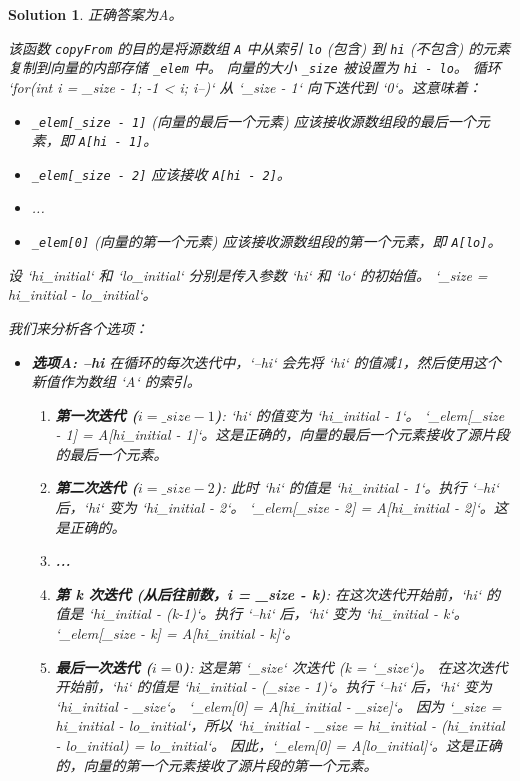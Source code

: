 \documentclass[UTF8]{report}
\newtheorem{solution}{Solution}
\theoremstyle{MyLineTheoremStyle} %
\theoremstyle{MyBlockTheoremStyle} %
\theoremstyle{MySubsubsectionStyle} %
\begin{document}
\begin{solution}
正确答案为A。

该函数 \texttt{copyFrom} 的目的是将源数组 \texttt{A} 中从索引 \texttt{lo} (包含) 到 \texttt{hi} (不包含) 的元素复制到向量的内部存储 \texttt{\_elem} 中。
向量的大小 \texttt{\_size} 被设置为 \texttt{hi - lo}。
循环 `for(int i = \_size - 1; -1 < i; i--)` 从 `\_size - 1` 向下迭代到 `0`。这意味着：
\begin{itemize}
    \item \texttt{\_elem[\_size - 1]} (向量的最后一个元素) 应该接收源数组段的最后一个元素，即 \texttt{A[hi - 1]}。
    \item \texttt{\_elem[\_size - 2]} 应该接收 \texttt{A[hi - 2]}。
    \item ...
    \item \texttt{\_elem[0]} (向量的第一个元素) 应该接收源数组段的第一个元素，即 \texttt{A[lo]}。
\end{itemize}

设 `hi\_initial` 和 `lo\_initial` 分别是传入参数 `hi` 和 `lo` 的初始值。
`\_size = hi\_initial - lo\_initial`。

我们来分析各个选项：

\begin{itemize}
    \item \textbf{选项A: --hi}
    在循环的每次迭代中，`--hi` 会先将 `hi` 的值减1，然后使用这个新值作为数组 `A` 的索引。
    \begin{enumerate}
        \item \textbf{第一次迭代 ($i = \_size - 1$)}:
        `hi` 的值变为 `hi\_initial - 1`。
        `\_elem[\_size - 1] = A[hi\_initial - 1]`。这是正确的，向量的最后一个元素接收了源片段的最后一个元素。
        \item \textbf{第二次迭代 ($i = \_size - 2$)}:
        此时 `hi` 的值是 `hi\_initial - 1`。执行 `--hi` 后，`hi` 变为 `hi\_initial - 2`。
        `\_elem[\_size - 2] = A[hi\_initial - 2]`。这是正确的。
        \item \textbf{...}
        \item \textbf{第 k 次迭代 (从后往前数，i = \_size - k)}:
        在这次迭代开始前，`hi` 的值是 `hi\_initial - (k-1)`。执行 `--hi` 后，`hi` 变为 `hi\_initial - k`。
        `\_elem[\_size - k] = A[hi\_initial - k]`。
        \item \textbf{最后一次迭代 ($i = 0$)}:
        这是第 `\_size` 次迭代 (k = `\_size`)。
        在这次迭代开始前，`hi` 的值是 `hi\_initial - (\_size - 1)`。执行 `--hi` 后，`hi` 变为 `hi\_initial - \_size`。
        `\_elem[0] = A[hi\_initial - \_size]`。
        因为 `\_size = hi\_initial - lo\_initial`，所以 `hi\_initial - \_size = hi\_initial - (hi\_initial - lo\_initial) = lo\_initial`。
        因此，`\_elem[0] = A[lo\_initial]`。这是正确的，向量的第一个元素接收了源片段的第一个元素。
    \end{enumerate}


\end{itemize}
\end{solution}
\end{document}
